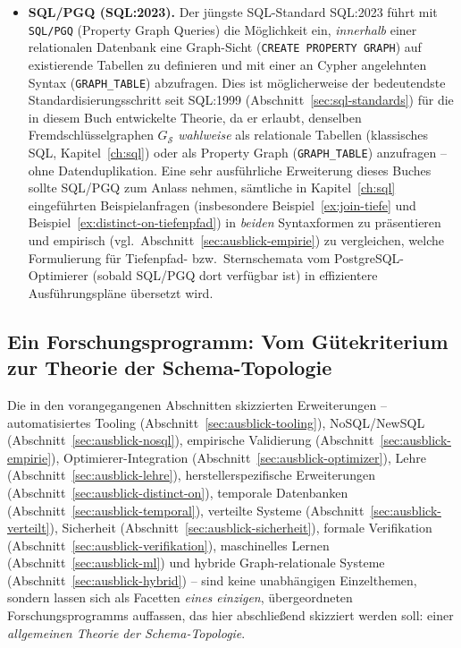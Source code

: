 ﻿\documentclass[a4paper,12pt]{report}
\theoremstyle{definition}
\theoremstyle{remark}
\begin{document}
\begin{itemize}
  \item \textbf{SQL/PGQ (SQL:2023).} Der jüngste SQL-Standard
    SQL:2023 führt mit \texttt{SQL/PGQ} (Property Graph Queries) die
    Möglichkeit ein, \emph{innerhalb} einer relationalen Datenbank
    eine Graph-Sicht (\texttt{CREATE PROPERTY GRAPH}) auf
    existierende Tabellen zu definieren und mit einer an Cypher
    angelehnten Syntax (\texttt{GRAPH\_TABLE}) abzufragen. Dies ist
    möglicherweise der bedeutendste Standardisierungsschritt seit
    SQL:1999 (Abschnitt~\ref{sec:sql-standards}) für die in diesem
    Buch entwickelte Theorie, da er erlaubt, denselben
    Fremdschlüsselgraphen $G_{\mathcal{S}}$ \emph{wahlweise} als
    relationale Tabellen (klassisches SQL,
    Kapitel~\ref{ch:sql}) oder als Property Graph
    (\texttt{GRAPH\_TABLE}) anzufragen -- ohne Datenduplikation. Eine
    sehr ausführliche Erweiterung dieses Buches sollte SQL/PGQ zum
    Anlass nehmen, sämtliche in Kapitel~\ref{ch:sql} eingeführten
    Beispielanfragen (insbesondere Beispiel~\ref{ex:join-tiefe} und
    Beispiel~\ref{ex:distinct-on-tiefenpfad}) in \emph{beiden}
    Syntaxformen zu präsentieren und empirisch (vgl.\
    Abschnitt~\ref{sec:ausblick-empirie}) zu vergleichen, welche
    Formulierung für Tiefenpfad- bzw.\ Sternschemata vom
    PostgreSQL-Optimierer (sobald SQL/PGQ dort verfügbar ist) in
    effizientere Ausführungspläne übersetzt wird.
\end{itemize}

\subsection{Ein Forschungsprogramm: Vom Gütekriterium zur Theorie der Schema-Topologie}
\label{sec:ausblick-forschungsprogramm}

Die in den vorangegangenen Abschnitten skizzierten Erweiterungen --
automatisiertes Tooling (Abschnitt~\ref{sec:ausblick-tooling}),
NoSQL/NewSQL (Abschnitt~\ref{sec:ausblick-nosql}), empirische
Validierung (Abschnitt~\ref{sec:ausblick-empirie}),
Optimierer-Integration (Abschnitt~\ref{sec:ausblick-optimizer}),
Lehre (Abschnitt~\ref{sec:ausblick-lehre}), herstellerspezifische
Erweiterungen (Abschnitt~\ref{sec:ausblick-distinct-on}), temporale
Datenbanken (Abschnitt~\ref{sec:ausblick-temporal}), verteilte
Systeme (Abschnitt~\ref{sec:ausblick-verteilt}), Sicherheit
(Abschnitt~\ref{sec:ausblick-sicherheit}), formale Verifikation
(Abschnitt~\ref{sec:ausblick-verifikation}), maschinelles Lernen
(Abschnitt~\ref{sec:ausblick-ml}) und hybride Graph-relationale
Systeme (Abschnitt~\ref{sec:ausblick-hybrid}) -- sind keine
unabhängigen Einzelthemen, sondern lassen sich als Facetten
\emph{eines einzigen}, übergeordneten Forschungsprogramms auffassen,
das hier abschließend skizziert werden soll: einer
\emph{allgemeinen Theorie der Schema-Topologie}.
\end{document}
